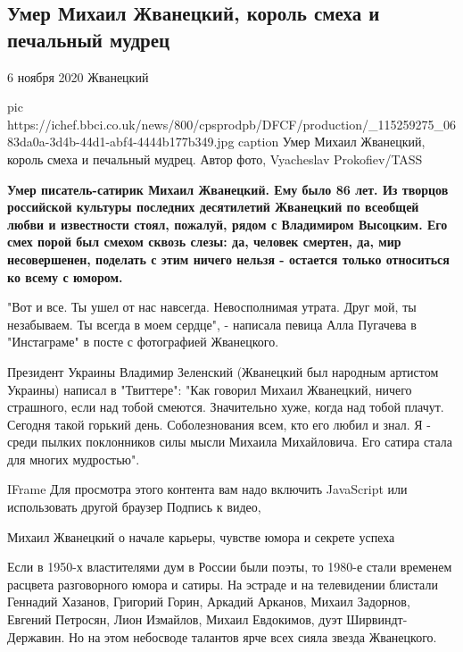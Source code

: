  
 
 

\subsection{Умер Михаил Жванецкий, король смеха и печальный мудрец}
\label{sec:06_11_2020.news.ru.bbc.1.death.zhvaneckii}

6 ноября 2020
Жванецкий

\ifcmt
pic https://ichef.bbci.co.uk/news/800/cpsprodpb/DFCF/production/_115259275_0683da0a-3d4b-44d1-abf4-4444b177b349.jpg
caption Умер Михаил Жванецкий, король смеха и печальный мудрец. Автор фото, Vyacheslav Prokofiev/TASS
\fi


{\bfseries
Умер писатель-сатирик Михаил Жванецкий. Ему было 86 лет. Из творцов российской
культуры последних десятилетий Жванецкий по всеобщей любви и известности стоял,
пожалуй, рядом с Владимиром Высоцким. Его смех порой был смехом сквозь слезы:
да, человек смертен, да, мир несовершенен, поделать с этим ничего нельзя -
остается только относиться ко всему с юмором.
}

"Вот и все. Ты ушел от нас навсегда. Невосполнимая утрата. Друг мой, ты
незабываем. Ты всегда в моем сердце", - написала певица Алла Пугачева в
"Инстаграме" в посте с фотографией Жванецкого.

Президент Украины Владимир Зеленский (Жванецкий был народным артистом
Украины) написал в "Твиттере": "Как говорил Михаил Жванецкий, ничего
страшного, если над тобой смеются. Значительно хуже, когда над тобой
плачут. Сегодня такой горький день. Соболезнования всем, кто его любил и
знал. Я - среди пылких поклонников силы мысли Михаила Михайловича. Его
сатира стала для многих мудростью".

IFrame
Для просмотра этого контента вам надо включить JavaScript или использовать
другой браузер
Подпись к видео,

Михаил Жванецкий о начале карьеры, чувстве юмора и секрете успеха

Если в 1950-х властителями дум в России были поэты, то 1980-е стали
временем расцвета разговорного юмора и сатиры. На эстраде и на телевидении
блистали Геннадий Хазанов, Григорий Горин, Аркадий Арканов, Михаил
Задорнов, Евгений Петросян, Лион Измайлов, Михаил Евдокимов, дуэт
Ширвиндт-Державин. Но на этом небосводе талантов ярче всех сияла звезда
Жванецкого.

